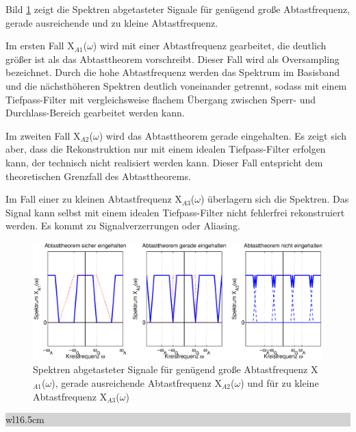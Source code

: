 \noindent Bild \ref{fig:SpektrenAbgetasteterSignale} zeigt die Spektren abgetasteter Signale für genügend gro{\ss}e Abtastfrequenz, gerade ausreichende und zu kleine Abtastfrequenz. 


\noindent Im ersten Fall X$_{A1}$($\omega$) wird mit einer Abtastfrequenz gearbeitet, die deutlich grö{\ss}er ist als das Abtasttheorem vorschreibt. Dieser Fall wird als Oversampling bezeichnet. Durch die hohe Abtastfrequenz werden das Spektrum im Basisband und die nächsthöheren Spektren deutlich voneinander getrennt, sodass mit einem Tiefpass-Filter mit vergleichsweise flachem Übergang zwischen Sperr- und Durchlass-Bereich gearbeitet werden kann.

\noindent Im zweiten Fall X${}_{A2}$($\omega$) wird das Abtasttheorem gerade eingehalten. Es zeigt sich aber, dass die Rekonstruktion nur mit einem idealen Tiefpass-Filter erfolgen kann, der technisch nicht realisiert werden kann. Dieser Fall entspricht dem theoretischen Grenzfall des Abtasttheorems. 

\noindent Im Fall einer zu kleinen Abtastfrequenz X$_{A3}$($\omega$) überlagern sich die Spektren. Das Signal kann selbst mit einem idealen Tiefpass-Filter nicht fehlerfrei rekonstruiert werden. Es kommt zu Signalverzerrungen oder Aliasing. 
\begin{figure}[H]
  \centerline{\includegraphics[width=1\textwidth]{Kapitel1/Bilder/image10}}
  \caption{Spektren abgetasteter Signale für genügend gro{\ss}e Abtastfrequenz X$_{A1}$($\omega$), gerade ausreichende Abtastfrequenz X$_{A2}$($\omega$) und für zu kleine Abtastfrequenz X$_{A3}$($\omega$)}
  \label{fig:SpektrenAbgetasteterSignale}
\end{figure}

\noindent
\colorbox{lightgray}{%
%
\renewcommand\arraystretch{0.6}%
\begin{tabular}{ wl{16.5cm} }
{\selectfont{Beispiel: Abtastrate einer Sound-Karte} }
\end{tabular}%
}\medskip

